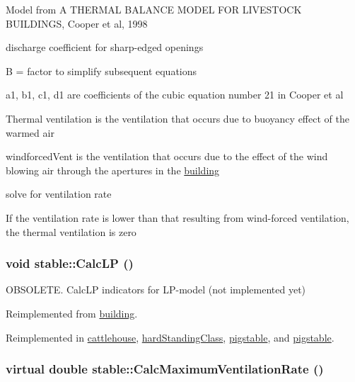 Model from A THERMAL BALANCE MODEL FOR LIVESTOCK BUILDINGS, Cooper et al, 1998

discharge coefficient for sharp-\/edged openings

B = factor to simplify subsequent equations

a1, b1, c1, d1 are coefficients of the cubic equation number 21 in Cooper et al

Thermal ventilation is the ventilation that occurs due to buoyancy effect of the warmed air

windforcedVent is the ventilation that occurs due to the effect of the wind blowing air through the apertures in the \hyperlink{classbuilding}{building}

solve for ventilation rate

If the ventilation rate is lower than that resulting from wind-\/forced ventilation, the thermal ventilation is zero \hypertarget{classstable_acaf566bef659f0a671e27afa6244df4b}{
\subsubsection[{CalcLP}]{\setlength{\rightskip}{0pt plus 5cm}void stable::CalcLP ()}}
\label{classstable_acaf566bef659f0a671e27afa6244df4b}


OBSOLETE. CalcLP indicators for LP-\/model (not implemented yet) 

Reimplemented from \hyperlink{classbuilding_af1f27cbf72295547af61edc9e02a7e61}{building}.

Reimplemented in \hyperlink{classcattlehouse_a7806fd8778ff33751dcb81e06a01471e}{cattlehouse}, \hyperlink{classhard_standing_class_a03f3703e524d927cbf930e47bebd846d}{hardStandingClass}, \hyperlink{classpigstable_a9e56606838c623a05cb2f6e0b721cc47}{pigstable}, and \hyperlink{classpigstable_aff8c1aa84a8727d9a5c6d060bf6fe323}{pigstable}.\hypertarget{classstable_a40ccfa66db782fe4bb8fdcb19ef20f00}{
\subsubsection[{CalcMaximumVentilationRate}]{\setlength{\rightskip}{0pt plus 5cm}virtual double stable::CalcMaximumVentilationRate ()}}
\label{classstable_a40ccfa66db782fe4bb8fdcb19ef20f00}


